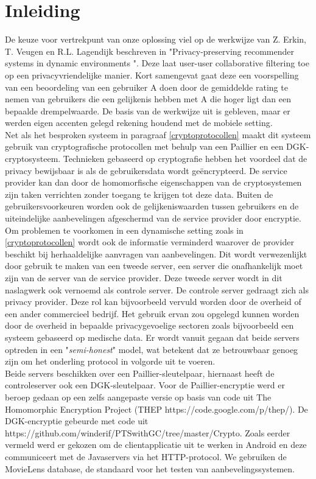 
\section{Inleiding}
De keuze voor vertrekpunt van onze oplossing viel op de werkwijze van Z. Erkin, T. Veugen en R.L. Lagendijk beschreven in "Privacy-preserving recommender systems in dynamic environments \cite{ZErkinDyn}". Deze laat user-user collaborative filtering toe op een privacyvriendelijke manier. Kort samengevat gaat deze een voorspelling van een beoordeling van een gebruiker A doen door de gemiddelde rating te nemen van gebruikers die een gelijkenis hebben met A die hoger ligt dan een bepaalde drempelwaarde. De basis van de werkwijze uit \cite{ZErkinDyn} is gebleven, maar er werden eigen accenten gelegd rekening houdend met de mobiele setting. \\Net als het besproken systeem in paragraaf \ref{cryptoprotocollen} maakt dit systeem gebruik van cryptografische protocollen met behulp van een Paillier en een DGK-cryptosysteem. Technieken gebaseerd op cryptografie hebben het voordeel dat de privacy bewijsbaar is als de gebruikersdata wordt ge\"encrypteerd. De service provider kan dan door de homomorfische eigenschappen van de cryptosystemen zijn taken verrichten zonder toegang te krijgen tot deze data. Buiten de gebruikersvoorkeuren worden ook de gelijkeniswaarden tussen gebruikers en de uiteindelijke aanbevelingen afgeschermd van de service provider door encryptie.\\ Om problemen te voorkomen in een dynamische setting zoals in \ref{cryptoprotocollen} wordt ook de informatie verminderd waarover de provider beschikt bij herhaaldelijke aanvragen van aanbevelingen. Dit wordt verwezenlijkt door gebruik te maken van een tweede server, een server die onafhankelijk moet zijn van de server van de service provider. Deze tweede server wordt in dit naslagwerk ook vernoemd als controle server. De controle server gedraagt zich als privacy provider. Deze rol kan bijvoorbeeld vervuld worden door de overheid of een ander commercieel bedrijf. Het gebruik ervan zou opgelegd kunnen worden door de overheid in bepaalde privacygevoelige sectoren zoals bijvoorbeeld een systeem gebaseerd op medische data. Er wordt vanuit gegaan dat beide servers optreden in een "\emph{semi-honest}" model, wat betekent dat ze betrouwbaar genoeg zijn om het onderling protocol in volgorde uit te voeren. \\ Beide servers beschikken over een Paillier-sleutelpaar, hiernaast heeft de controleserver ook een DGK-sleutelpaar. Voor de Paillier-encryptie werd er beroep gedaan op een zelfs aangepaste versie op basis van code uit The Homomorphic Encryption Project (THEP https://code.google.com/p/thep/). De DGK-encryptie gebeurde met code uit https://github.com/winderif/PTSwithGC/tree/master/Crypto. Zoals eerder vermeld werd er gekozen om de clientapplicatie uit te werken in Android en deze communiceert met de Javaservers via het HTTP-protocol. We gebruiken de MovieLens database, de standaard voor het testen van aanbevelingssystemen.